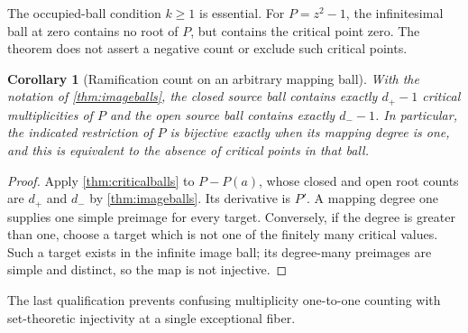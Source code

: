 \documentclass[11pt,letterpaper]{article}
\numberwithin{equation}{section}
\newtheorem{corollary}[theorem]{Corollary}
\theoremstyle{definition}
\theoremstyle{remark}\newtheorem{remark}[theorem]{Remark}
\begin{document}
The occupied-ball condition $k\ge1$ is essential. For $P=z^2-1$, the
infinitesimal ball at zero contains no root of $P$, but contains the
critical point zero. The theorem does not assert a negative count or
exclude such critical points.

\begin{corollary}[Ramification count on an arbitrary mapping ball]
\label{cor:ramificationball}
With the notation of \cref{thm:imageballs}, the closed source ball
contains exactly $d_+-1$ critical multiplicities of $P$ and the open
source ball contains exactly $d_--1$. In particular, the indicated
restriction of $P$ is bijective exactly when its mapping degree is one,
and this is equivalent to the absence of critical points in that ball.
\end{corollary}
\begin{proof}
Apply \cref{thm:criticalballs} to $P-P(a)$, whose closed and open
root counts are $d_+$ and $d_-$ by \cref{thm:imageballs}. Its derivative
is $P'$. A mapping degree one supplies one simple preimage for every
target. Conversely, if the degree is greater than one, choose a target
which is not one of the finitely many critical values. Such a target
exists in the infinite image ball; its degree-many preimages are
simple and distinct, so the map is not injective.
\end{proof}
The last qualification prevents confusing multiplicity one-to-one
counting with set-theoretic injectivity at a single exceptional fiber.
\end{document}
